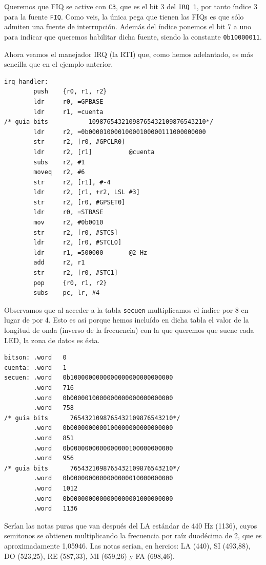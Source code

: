 Queremos que FIQ se active con {\tt C3}, que es el bit 3 del {\tt IRQ 1}, por tanto
índice 3 para la fuente {\tt FIQ}. Como veis, la única pega que tienen las FIQs es que
sólo admiten una fuente de interrupción. Además del índice ponemos el bit 7 a uno para
indicar que queremos habilitar dicha fuente, siendo la constante {\tt 0b10000011}.

Ahora veamos el manejador IRQ (la RTI) que, como hemos adelantado, es más sencilla que en el
ejemplo anterior.

\begin{lstlisting}
irq_handler:
        push    {r0, r1, r2}
        ldr     r0, =GPBASE
        ldr     r1, =cuenta
/* guia bits           10987654321098765432109876543210*/
        ldr     r2, =0b00001000010000100000111000000000
        str     r2, [r0, #GPCLR0]
        ldr     r2, [r1]          @cuenta
        subs    r2, #1
        moveq   r2, #6
        str     r2, [r1], #-4
        ldr     r2, [r1, +r2, LSL #3]
        str     r2, [r0, #GPSET0]
        ldr     r0, =STBASE
        mov     r2, #0b0010
        str     r2, [r0, #STCS]
        ldr     r2, [r0, #STCLO]
        ldr     r1, =500000       @2 Hz
        add     r2, r1
        str     r2, [r0, #STC1]
        pop     {r0, r1, r2}
        subs    pc, lr, #4
\end{lstlisting}

Observamos que al acceder a la tabla {\tt secuen} multiplicamos el índice por 8 en lugar de
por 4. Esto es así porque hemos incluído en dicha tabla el valor de la longitud de onda (inverso
de la frecuencia) con la que queremos que suene cada LED, la zona de datos es ésta.

\begin{lstlisting}
bitson: .word   0
cuenta: .word   1
secuen: .word   0b1000000000000000000000000000
        .word   716
        .word   0b0000010000000000000000000000
        .word   758
/* guia bits      7654321098765432109876543210*/
        .word   0b0000000000100000000000000000
        .word   851
        .word   0b0000000000000000100000000000
        .word   956
/* guia bits      7654321098765432109876543210*/
        .word   0b0000000000000000010000000000
        .word   1012
        .word   0b0000000000000000001000000000
        .word   1136
\end{lstlisting}

Serían las notas puras que van después del LA estándar de 440 Hz (1136), cuyos semitonos se
obtienen multiplicando la frecuencia por raíz duodécima de 2, que es aproximadamente 1,05946.
Las notas serían, en hercios: LA (440), SI (493,88), DO (523,25), RE (587,33), MI (659,26) y
FA (698,46).

